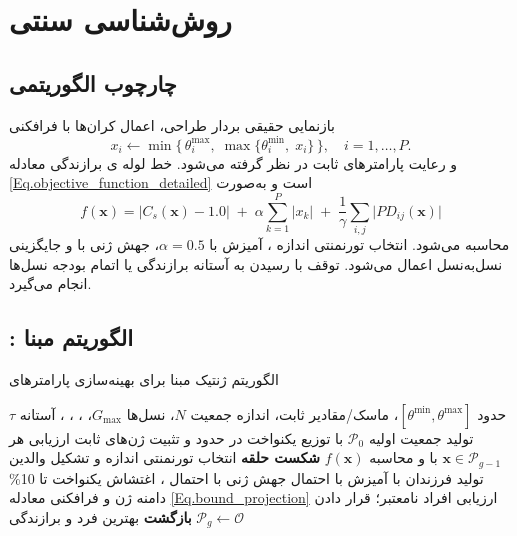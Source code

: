 \section{روش‌شناسی  سنتی}
\subsection{چارچوب الگوریتمی}
بازنمایی حقیقی بردار طراحی، اعمال کران‌ها با فرافکنی
\begin{equation}\label{Eq.bound_projection}
 x_i \leftarrow \min\{\, \theta_i^{\max},\; \max\{\theta_i^{\min},\; x_i\}\,\},\quad i=1,\dots,P.
\end{equation}
و رعایت پارامترهای ثابت در نظر گرفته می‌شود. خط لوله ی برازندگی معادله \eqref{Eq.objective_function_detailed} است و به‌صورت
\begin{equation}
 f(\mathbf{x})=\big|C_s(\mathbf{x})-1.0\big|\; +\; \alpha\sum_{k=1}^{P}|x_k|\; +\; \frac{1}{\gamma}\sum_{i,j}\big|PD_{ij}(\mathbf{x})\big|
\end{equation}
محاسبه می‌شود. انتخاب تورنمنتی اندازه ، آمیزش  با $\alpha=0.5$، جهش ژنی با  و جایگزینی نسل‌به‌نسل اعمال می‌شود. توقف با رسیدن به آستانه برازندگی یا اتمام بودجه نسل‌ها انجام می‌گیرد.

\subsection{: الگوریتم مبنا}
\begin{algorithm}[H]
\caption{الگوریتم ژنتیک مبنا برای بهینه‌سازی پارامترهای }
\begin{algorithmic}[1]
\REQUIRE حدود $[\theta^{\min},\theta^{\max}]$، ماسک/مقادیر ثابت، اندازه جمعیت $N$، نسل‌ها $G_{\max}$، ، ، ، آستانه $\tau$
\STATE تولید جمعیت اولیه $\mathcal{P}_0$ با توزیع یکنواخت در حدود و تثبیت ژن‌های ثابت
    \STATE ارزیابی هر $\mathbf{x}\in\mathcal{P}_{g-1}$ با  و محاسبه $f(\mathbf{x})$
     \textbf{شکست حلقه} \ENDIF
    \STATE انتخاب تورنمنتی اندازه  و تشکیل والدین
    \STATE تولید فرزندان با آمیزش  با احتمال 
        \STATE جهش ژنی با احتمال ، اغتشاش یکنواخت تا 10\% دامنه ژن و فرافکنی معادله \eqref{Eq.bound_projection}
    \ENDFOR
    \STATE ارزیابی افراد نامعتبر؛ قرار دادن $\mathcal{P}_g\leftarrow\mathcal{O}$
\ENDFOR
\STATE \textbf{بازگشت} بهترین فرد و برازندگی
\end{algorithmic}
\end{algorithm}

